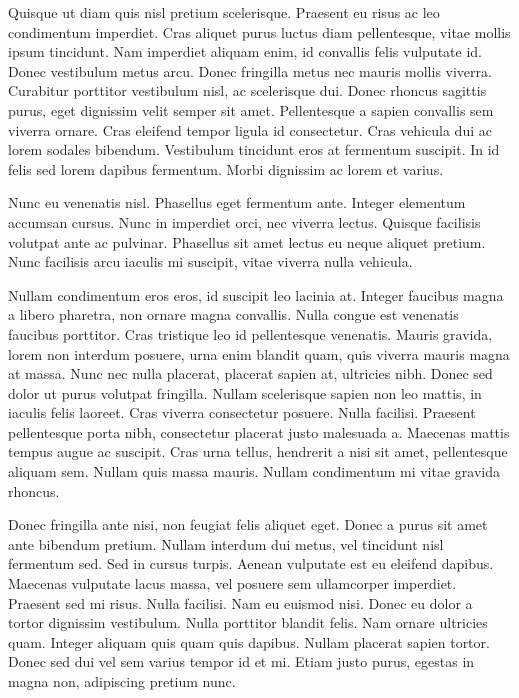 Quisque ut diam quis nisl pretium scelerisque. Praesent eu risus ac leo condimentum imperdiet. Cras aliquet purus luctus diam pellentesque, vitae mollis ipsum tincidunt. Nam imperdiet aliquam enim, id convallis felis vulputate id. Donec vestibulum metus arcu. Donec fringilla metus nec mauris mollis viverra. Curabitur porttitor vestibulum nisl, ac scelerisque dui. Donec rhoncus sagittis purus, eget dignissim velit semper sit amet. Pellentesque a sapien convallis sem viverra ornare. Cras eleifend tempor ligula id consectetur. Cras vehicula dui ac lorem sodales bibendum. Vestibulum tincidunt eros at fermentum suscipit. In id felis sed lorem dapibus fermentum. Morbi dignissim ac lorem et varius.

Nunc eu venenatis nisl. Phasellus eget fermentum ante. Integer elementum accumsan cursus. Nunc in imperdiet orci, nec viverra lectus. Quisque facilisis volutpat ante ac pulvinar. Phasellus sit amet lectus eu neque aliquet pretium. Nunc facilisis arcu iaculis mi suscipit, vitae viverra nulla vehicula.

Nullam condimentum eros eros, id suscipit leo lacinia at. Integer faucibus magna a libero pharetra, non ornare magna convallis. Nulla congue est venenatis faucibus porttitor. Cras tristique leo id pellentesque venenatis. Mauris gravida, lorem non interdum posuere, urna enim blandit quam, quis viverra mauris magna at massa. Nunc nec nulla placerat, placerat sapien at, ultricies nibh. Donec sed dolor ut purus volutpat fringilla. Nullam scelerisque sapien non leo mattis, in iaculis felis laoreet. Cras viverra consectetur posuere. Nulla facilisi. Praesent pellentesque porta nibh, consectetur placerat justo malesuada a. Maecenas mattis tempus augue ac suscipit. Cras urna tellus, hendrerit a nisi sit amet, pellentesque aliquam sem. Nullam quis massa mauris. Nullam condimentum mi vitae gravida rhoncus.

Donec fringilla ante nisi, non feugiat felis aliquet eget. Donec a purus sit amet ante bibendum pretium. Nullam interdum dui metus, vel tincidunt nisl fermentum sed. Sed in cursus turpis. Aenean vulputate est eu eleifend dapibus. Maecenas vulputate lacus massa, vel posuere sem ullamcorper imperdiet. Praesent sed mi risus. Nulla facilisi. Nam eu euismod nisi. Donec eu dolor a tortor dignissim vestibulum. Nulla porttitor blandit felis. Nam ornare ultricies quam. Integer aliquam quis quam quis dapibus. Nullam placerat sapien tortor. Donec sed dui vel sem varius tempor id et mi. Etiam justo purus, egestas in magna non, adipiscing pretium nunc.


